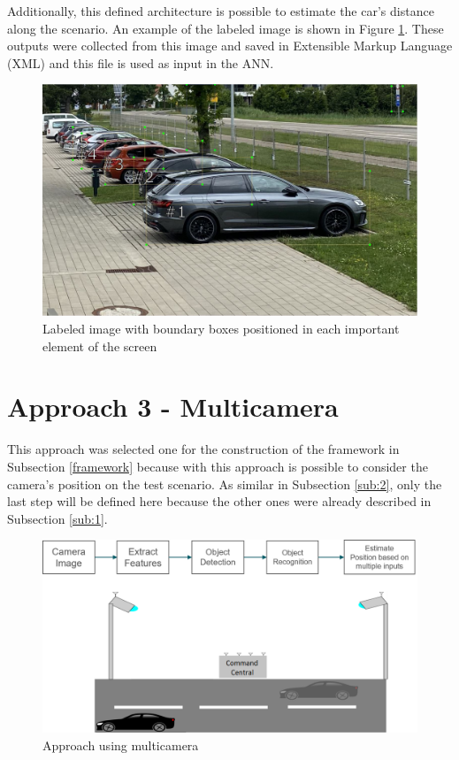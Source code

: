 Additionally, this defined architecture is possible to estimate the car's distance along the scenario. An example of the labeled image is shown in Figure \ref{fig:boundary_boxes_car}. These outputs were collected from this image and saved in Extensible Markup Language (XML) and this file is used as input in the ANN. 


\begin{figure}[H]
\centering
\includegraphics[scale=0.5]{imagens/boundary_boxes.JPG}
\caption{Labeled image with boundary boxes positioned in each important element of the screen}
\label{fig:boundary_boxes_car}
\end{figure}




\section{Approach 3 - Multicamera}\label{sub:3}

This approach was selected one for the construction of the framework in Subsection \ref{framework} because with this approach is possible to consider the camera's position on the test scenario. As similar in Subsection \ref{sub:2}, only the last step will be defined here because the other ones were already described in Subsection \ref{sub:1}. 


\begin{figure}[H]
\centering
\includegraphics[scale=0.6]{imagens/proposal3.png}
\caption{Approach using multicamera}
\label{fig:proposal3}
\end{figure}

